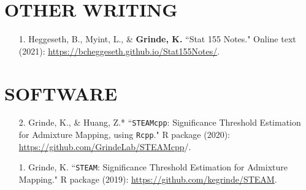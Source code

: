 \documentclass[margin]{res}
\newenvironment{benumerate}[1]{
    \let\oldItem\item
    \def\item{\addtocounter{enumi}{-2}\oldItem}
    
    \begin{enumerate}
    \setcounter{enumi}{#1}
    \addtocounter{enumi}{1}
}{
    \end{enumerate}
}
\begin{document}
\begin{resume}



\section{OTHER WRITING}

\begin{itemize}
\item[1.] Heggeseth, B., Myint, L., \& \textbf{Grinde, K.} ``Stat 155 Notes." Online text (2021): \href{https://bcheggeseth.github.io/Stat155Notes/}{https://bcheggeseth.github.io/Stat155Notes/}.\\
\end{itemize}

\section{SOFTWARE} 

\begin{itemize}
\item[2.] Grinde, K., \& Huang, Z.* ``\texttt{STEAMcpp}: Significance Threshold Estimation for Admixture Mapping, using \texttt{Rcpp}." R package (2020): \\ \href{https://github.com/GrindeLab/STEAMcpp}{https://github.com/GrindeLab/STEAMcpp}/.
\item[1.] Grinde, K. ``\texttt{STEAM}: Significance Threshold Estimation for Admixture Mapping." R package (2019): \href{https://github.com/kegrinde/STEAM}{https://github.com/kegrinde/STEAM}.
\end{itemize}
					



\end{resume}
\end{document}
